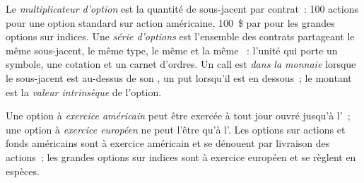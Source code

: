 \begin{definition}\label{def:m1:option-contracts-and-exchanges:series}
Le \emph{multiplicateur d'option} est la quantité de
sous-jacent par contrat~: 100 actions pour une option standard sur action américaine, 100~\$
par  pour les grandes options sur indices. Une \emph{série d'options}
est l'ensemble des contrats partageant le même sous-jacent, le même type, le même
 et la même ~: l'unité qui porte un symbole, une cotation et
un carnet d'ordres. Un call est \emph{dans la monnaie} lorsque le
sous-jacent est au-dessus de son , un put lorsqu'il est en dessous~; le montant est la
\emph{valeur intrinsèque} de l'option.
\end{definition}

\begin{definition}\label{def:m1:option-contracts-and-exchanges:style}
Une option à \emph{exercice américain} peut être
exercée à tout jour ouvré jusqu'à l'~; une option à
\emph{exercice européen} ne peut l'être qu'à l'. Les options sur actions et
fonds américains sont à exercice américain et se dénouent par livraison des
actions~; les grandes options sur indices sont à exercice européen et se règlent en espèces.
\end{definition}


